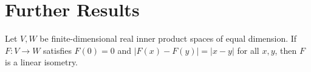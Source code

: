 \section{Further Results}

\begin{proposition}\label{prop:distance-preserving-map-linear-isometry}


Let $V,W$ be finite-dimensional real inner product spaces of equal dimension.
If $F:V\to W$ satisfies $F(0)=0$ and
$|F(x)-F(y)|=|x-y|$ for all $x,y$, then $F$ is a linear isometry.
\end{proposition}

